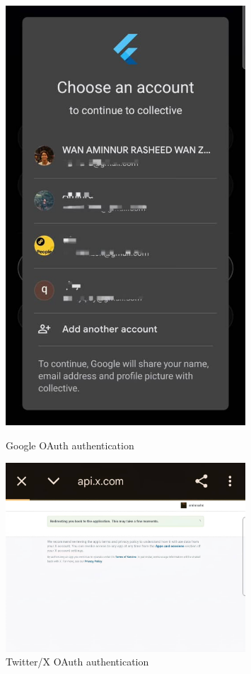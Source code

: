 \begin{figure}[H]
\centering
\begin{minipage}{0.4\textwidth}
\centering
\includegraphics[width=0.8\textwidth]{files/imgs/prototype/google_oauth.jpeg}
\caption{Google OAuth authentication}
\label{fig:google-oauth}
\end{minipage}
\hfill
\begin{minipage}{0.4\textwidth}
\centering
\includegraphics[width=0.8\textwidth]{files/imgs/prototype/x_oauth.jpeg}
\caption{Twitter/X OAuth authentication}
\label{fig:twitter-oauth}
\end{minipage}
\end{figure}

